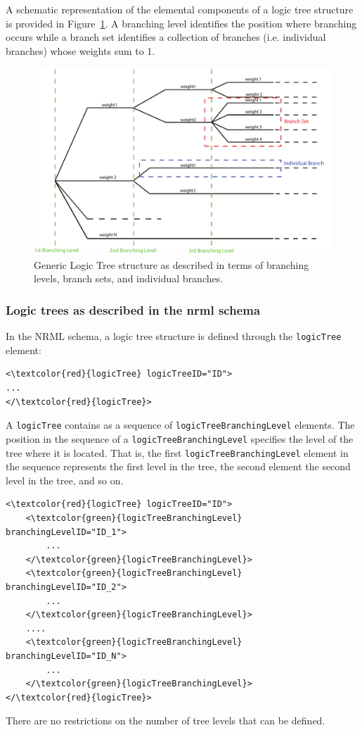 A schematic representation of the elemental components of a logic tree 
structure is provided in Figure~\ref{glts}. 
A branching level identifies the position where branching occurs while 
a branch set identifies a collection of branches (i.e. individual branches) 
whose weights sum to 1.
%
\begin{figure}[!ht]
\centering
\includegraphics[width=15cm]{figures/hazard/GenericLogicTreeStructure.pdf}
\caption{Generic Logic Tree structure as described in terms of branching 
levels, branch sets, and individual branches.}
\label{glts}
\end{figure}

\subsubsection{Logic trees as described in the nrml schema}
In the NRML schema, a logic tree structure is defined through the 
\Verb+logicTree+ element:
%
\begin{Verbatim}[frame=single, commandchars=\\\{\}]
<\textcolor{red}{logicTree} logicTreeID="ID">
...
</\textcolor{red}{logicTree}>
\end{Verbatim}
%
A \Verb+logicTree+ contains as a sequence of \Verb+logicTreeBranchingLevel+ 
elements.
The position in the sequence of a \Verb+logicTreeBranchingLevel+ specifies 
the level of the tree where it is located. That is, the first 
\texttt{logicTreeBranchingLevel} element in the sequence represents 
the first level in the tree, the second element the second level in
the tree, and so on.
%
\begin{Verbatim}[frame=single, commandchars=\\\{\}]
<\textcolor{red}{logicTree} logicTreeID="ID">
	<\textcolor{green}{logicTreeBranchingLevel} branchingLevelID="ID_1">
		...
	</\textcolor{green}{logicTreeBranchingLevel}>
	<\textcolor{green}{logicTreeBranchingLevel} branchingLevelID="ID_2">
		...
	</\textcolor{green}{logicTreeBranchingLevel}>
	....
	<\textcolor{green}{logicTreeBranchingLevel} branchingLevelID="ID_N">
		...
	</\textcolor{green}{logicTreeBranchingLevel}>
</\textcolor{red}{logicTree}>
\end{Verbatim}
There are no restrictions on the number of tree levels that can 
be defined.

